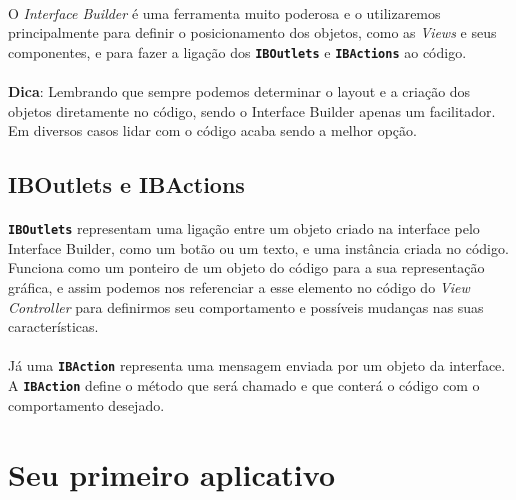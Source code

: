 \documentclass[a4paper,12pt,brazil,doubleside]{book}
\begin{document}
\begin{singlespace}
\paragraph{}O \emph{Interface Builder} é uma ferramenta muito poderosa e o utilizaremos principalmente para definir o posicionamento dos objetos, como as \emph{Views} e seus componentes, e para fazer a ligação dos \texttt{\textbf{IBOutlets}} e \texttt{\textbf{IBActions}} ao código.

\bigskip

\begin{framed}
\paragraph{}\textbf{Dica}:  Lembrando que sempre podemos determinar o layout e a criação dos objetos diretamente no código, sendo o Interface Builder apenas um facilitador. Em diversos casos lidar com o código acaba sendo a melhor opção.
\end{framed}

\bigskip

\subsection{IBOutlets e IBActions}

\paragraph{}\texttt{\textbf{IBOutlets}} representam uma ligação entre um objeto criado na interface pelo Interface Builder, como um botão ou um texto, e uma instância criada no código. Funciona como um ponteiro de um objeto do código para a sua representação gráfica, e assim podemos nos referenciar a esse elemento no código do \emph{View Controller} para definirmos seu comportamento e possíveis mudanças nas suas características.
\paragraph{}Já uma \texttt{\textbf{IBAction}} representa uma mensagem enviada por um objeto da interface. A \texttt{\textbf{IBAction}} define o método que será chamado e que conterá o código com o comportamento desejado.

\bigskip
\bigskip


\section{Seu primeiro aplicativo}


\end{singlespace}
\end{document}
